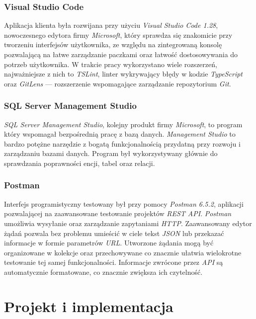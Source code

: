 \documentclass[eng,printmode,openany]{mgr}
\begin{document}
	\subsection{Visual Studio Code}
	Aplikacja klienta była rozwijana przy użyciu \textit{Visual Studio Code 1.28}, nowoczesnego edytora firmy \textit{Microsoft}, który sprawdza się znakomicie przy tworzeniu interfejsów użytkownika, ze względu na zintegrowaną konsolę pozwalającą na łatwe zarządzanie paczkami oraz łatwość dostosowywania do potrzeb użytkownika. W trakcie pracy wykorzystano wiele rozszerzeń, najważniejsze z nich to \textit{TSLint}, linter wykrywający błędy w kodzie \textit{TypeScript} oraz \textit{GitLens} — rozszerzenie wspomagające zarządzanie repozytorium \textit{Git}.
	
	\subsection{SQL Server Management Studio}
	\textit{SQL Server Management Studio}, kolejny produkt firmy \textit{Microsoft}, to program który wspomagał bezpośrednią pracę z bazą danych. \textit{Management Studio} to bardzo potężne narzędzie z bogatą funkcjonalnością przydatną przy rozwoju i zarządzaniu bazami danych. Program był wykorzystywany głównie do sprawdzania poprawności encji, tabel oraz relacji. 
	\subsection{Postman}
	Interfejs programistyczny testowany był przy pomocy \textit{Postman 6.5.2}, aplikacji pozwalającej na zaawansowane testowanie projektów \textit{REST API}. \textit{Postman} umożliwia wysyłanie oraz zarządzanie zapytaniami \textit{HTTP}. Zaawansowany edytor żądań pozwala bez problemu umieścić w ciele tekst \textit{JSON} lub przekazać informacje w formie parametrów \textit{URL}. Utworzone żądania mogą być organizowane w kolekcje oraz przechowywane co znacznie ułatwia wielokrotne testowanie tej samej funkcjonalności. Informacje zwrócone przez \textit{API} są automatycznie formatowane, co znacznie zwiększa ich czytelność.
	
	\newpage
	\chapter{Projekt i implementacja}
\end{document}
